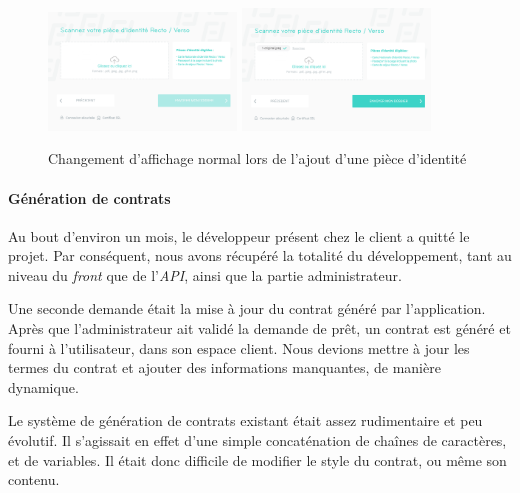\documentclass[12pt,a4paper]{article}
\begin{document}
  \begin{figure}[h]
    \centering
    \includegraphics[width=5cm]{figures/finfrog-1.png}
    \includegraphics[width=5cm]{figures/finfrog-2.png}
    \caption{Changement d'affichage normal lors de l'ajout d'une pièce d'identité}
  \end{figure}

  \paragraph{Génération de contrats}\label{guxe9nuxe9ration-de-contrats}

  Au bout d'environ un mois, le développeur présent chez le client a
  quitté le projet. Par conséquent, nous avons récupéré la totalité du
  développement, tant au niveau du \emph{front} que de l'\emph{API}, ainsi
  que la partie administrateur.

  \bigskip

  Une seconde demande était la mise à jour du contrat généré par
  l'application. Après que l'administrateur ait validé la demande de prêt,
  un contrat est généré et fourni à l'utilisateur, dans son espace client.
  Nous devions mettre à jour les termes du contrat et ajouter des
  informations manquantes, de manière dynamique.

  \bigskip

  Le système de génération de contrats existant était assez rudimentaire
  et peu évolutif. Il s'agissait en effet d'une simple concaténation de
  chaînes de caractères, et de variables. Il était donc difficile de
  modifier le style du contrat, ou même son contenu.
\end{document}
